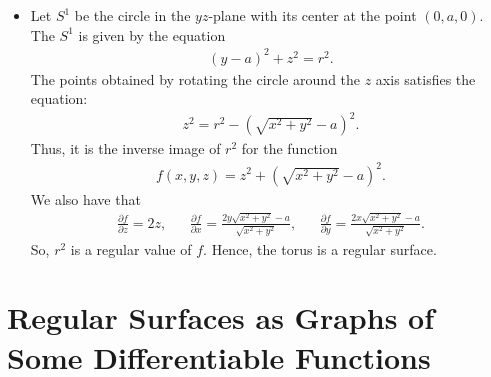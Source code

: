 \documentclass[10pt]{article}
\begin{document}
\begin{itemize}
    \item Let $S^1$ be the circle in the $yz$-plane with its center at the point $(0,a,0)$. The $S^1$ is given by the equation
    \begin{align*}
      (y - a)^2 + z^2 = r^2.
    \end{align*}
    The points obtained by rotating the circle around the $z$ axis satisfies the equation:
    \begin{align*}
      z^2 = r^2 - (\sqrt{x^2 + y^2} - a)^2.
    \end{align*}
    Thus, it is the inverse image of $r^2$ for the function
    \begin{align*}
      f(x,y,z) = z^2 + (\sqrt{x^2 + y^2} - a)^2.
    \end{align*}
    We also have that
    \begin{align*}
      \frac{\partial f}{\partial z} = 2z,
      & & \frac{\partial f}{\partial x} = \frac{2y\sqrt{x^2+y^2}-a}{\sqrt{x^2+y^2}},
      & & \frac{\partial f}{\partial y} = \frac{2x\sqrt{x^2+y^2}-a}{\sqrt{x^2+y^2}}.
    \end{align*}
    So, $r^2$ is a regular value of $f$. Hence, the torus is a regular surface.
  \end{itemize}  

  \section{Regular Surfaces as Graphs of Some Differentiable Functions}
\end{document}
